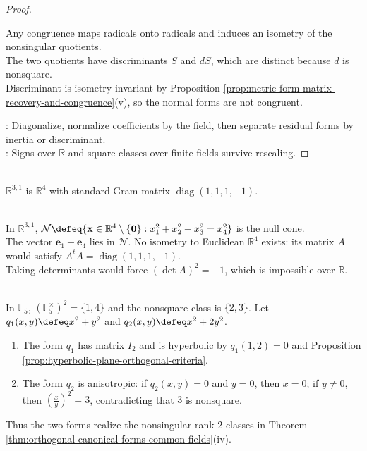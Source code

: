 \begin{theorem}
\begin{proof}
\begin{enumerate}[label=(\roman*)]
Any congruence maps radicals onto radicals and induces an isometry of the nonsingular quotients.\\
The two quotients have discriminants $S$ and $dS$, which are distinct because $d$ is nonsquare.\\
Discriminant is isometry-invariant by Proposition \ref{prop:metric-form-matrix-recovery-and-congruence}(v), so the normal forms are not congruent.
\end{enumerate}
: Diagonalize, normalize coefficients by the field, then separate residual forms by inertia or discriminant.\\
: Signs over $\mathbb{R}$ and square classes over finite fields survive rescaling.
\end{proof}
\end{theorem}

\begin{definition} \label{def:minkowski-metric-vector-space} \\
 $\mathbb{R}^{3,1}$ is $\mathbb{R}^4$ with standard Gram matrix $\operatorname{diag}(1,1,1,-1)$.
\end{definition}

\begin{example} \label{ex:minkowski-null-cone-and-inertia} \\
In $\mathbb{R}^{3,1}$, $\mathcal{N}\defeq\{\mathbf{x}\in\mathbb{R}^4\setminus\{\mathbf{0}\}:x_1^2+x_2^2+x_3^2=x_4^2\}$ is the null cone.\\
The vector $\mathbf{e}_1+\mathbf{e}_4$ lies in $\mathcal{N}$. No isometry to Euclidean $\mathbb{R}^4$ exists: its matrix $A$ would satisfy $A^tA=\operatorname{diag}(1,1,1,-1)$.\\
Taking determinants would force $(\det A)^2=-1$, which is impossible over $\mathbb{R}$.
\end{example}

\begin{example} \label{ex:finite-field-orthogonal-rank-two-classes} \\
In $\mathbb{F}_5$, $(\mathbb{F}_5^{\times})^2=\{1,4\}$ and the nonsquare class is $\{2,3\}$. Let $q_1(x,y)\defeq x^2+y^2$ and $q_2(x,y)\defeq x^2+2y^2$.
\begin{enumerate}[label=(\roman*)]
\setlength{\itemsep}{0pt}
\item The form $q_1$ has matrix $I_2$ and is hyperbolic by $q_1(1,2)=0$ and Proposition \ref{prop:hyperbolic-plane-orthogonal-criteria}.
\item The form $q_2$ is anisotropic: if $q_2(x,y)=0$ and $y=0$, then $x=0$; if $y\neq0$, then $\left(\frac{x}{y}\right)^2=3$, contradicting that $3$ is nonsquare.
\end{enumerate}
Thus the two forms realize the nonsingular rank-$2$ classes in Theorem \ref{thm:orthogonal-canonical-forms-common-fields}(iv).
\end{example}

